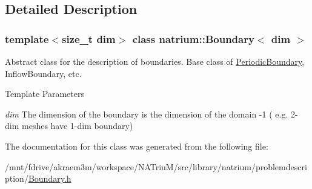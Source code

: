 \subsection{Detailed Description}
\subsubsection*{template$<$size\_\-t dim$>$ class natrium::Boundary$<$ dim $>$}

Abstract class for the description of boundaries. Base class of \hyperlink{classnatrium_1_1PeriodicBoundary}{PeriodicBoundary}, InflowBoundary, etc. 
\begin{DoxyTemplParams}{Template Parameters}
\item[{\em dim}]The dimension of the boundary is the dimension of the domain -\/1 ( e.g. 2-\/dim meshes have 1-\/dim boundary) \end{DoxyTemplParams}


The documentation for this class was generated from the following file:\begin{DoxyCompactItemize}
\item 
/mnt/fdrive/akraem3m/workspace/NATriuM/src/library/natrium/problemdescription/\hyperlink{Boundary_8h}{Boundary.h}\end{DoxyCompactItemize}
